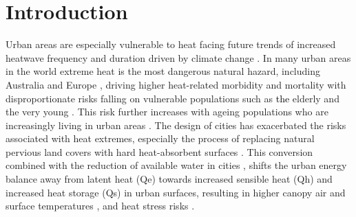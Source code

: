 \documentclass[final,3p,times,authoryear]{elsarticle}
\newcommand{\add}[1]{\textcolor{black}{#1}}
\begin{document}
\maketitle

\section{Introduction}\label{sec:introduction}

Urban areas are especially vulnerable to heat facing future trends of increased heatwave frequency and duration \citep{Cowan2014,Perkins-Kirkpatrick2020} driven by climate change \citep{IPCC2022}. In many urban areas in the world extreme heat is the most dangerous natural hazard, including Australia \citep{Coates2014} and Europe \citep{Forzieri2017}, driving higher heat-related morbidity and mortality \citep{Heidari2020} with disproportionate risks falling on vulnerable populations such as \add{the} elderly and the very young \citep{Nicholls2008,Wilson2011a}. This risk further increases with ageing populations who are increasingly living in urban areas \citep{ABS2008}. The design of cities has exacerbated the risks associated with heat extremes, especially the process of replacing natural pervious land covers with hard heat-absorbent surfaces \citep{Brunner2013}. This conversion combined with the reduction of available water in cities \citep{Spronken-Smith2010,Coutts2012,Middel2019a,Cheung2022b}, shifts the urban energy balance \citep{Oke1982,Oke1989} away from latent heat (\gls{Qe}) towards increased sensible heat (\gls{Qh}) and increased heat storage (\gls{Qs}) in urban surfaces, resulting in higher canopy air and surface temperatures \citep{Coutts2012,Martilli2020,Nice2022a}, and heat stress risks \citep{Nicholls2008,Loughnan2010,Nazarian2022}.
\end{document}
